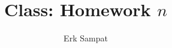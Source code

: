 \title{{\selectfont Class: } Homework $n$}
\author{Erk Sampat}


\usepackage{lipsum}

\maketitle
\prob
\lipsum[][1-2]

\lipsum[][1-2]
\begin{pp}
	\lipsum[][1-2]
	
	\lipsum[][1-2]
	\begin{spart}
		\lipsum[][1-2]
		
		\lipsum[][1-2]
	\end{spart}
\end{pp}
\begin{pp}
	\lipsum[][1-2]
	
	\lipsum[][1-2]
	\begin{spart}
		\lipsum[][1-2]
		
		\lipsum[][1-2]
	\end{spart}
	\begin{spart}
		\lipsum[][1-2]
		
		\lipsum[][1-2]
	\end{spart}
	\begin{spart}
		\lipsum[][1-2]
		
		\lipsum[][1-2]
	\end{spart}
	\begin{spart}
		\lipsum[][1-2]
		
		\lipsum[][1-2]
	\end{spart}
\end{pp}

